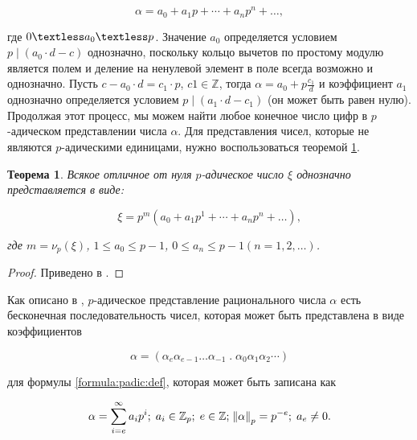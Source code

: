 \documentclass[master, och, diploma, times]{sty/SCWorks}
\theoremstyle{plain}
\newtheorem{thethm}{Теорема}[section]
\theoremstyle{definition}
\numberwithin{equation}{section}
\begin{document}
\begin{equation}\label{formula:padic:def}
\alpha=a_0+a_1p+\cdots+a_np^n+\dots,	
\end{equation}

\noindent где $0 \textless a_0 \textless p$. Значение $a_0$ определяется условием $p \mid (a_0 \cdot d-c)$ однозначно, поскольку кольцо вычетов по простому модулю является полем и деление на ненулевой элемент в поле всегда возможно и однозначно. Пусть $c-a_0 \cdot d=c_1 \cdot p$, $c1 \in \mathbb{Z}$, тогда $\alpha=a_0+p\frac{c_1}{d}$ и коэффициент $a_1$ однозначно определяется условием $p \mid (a_1 \cdot d-c_1)$ (он может быть равен нулю). Продолжая этот процесс, мы можем найти любое конечное число цифр в $p$-адическом представлении числа $\alpha$. Для представления чисел, которые не являются $p$-адическими единицами, нужно воспользоваться теоремой \ref{th:numbers:representation}.

\begin{thethm}\label{th:numbers:representation}
Всякое отличное от нуля $p$-адическое число $\xi$ однозначно представляется в виде:

\begin{equation}
\xi=p^m(a_0+a_1p^1+\cdots+a_np^n+\dots),
\end{equation}

\noindent где $m=\nu_p(\xi)$, $1 \le a_0 \le p-1$, $0 \le a_n \le p-1$$(n=1,2,\dots)$.
\end{thethm}

\begin{proof}
Приведено в \cite{bib:number:borevich}.
\end{proof}


Как описано в \cite{bib:analysis:schikhof}, $p$-адическое представление рационального числа $\alpha$ есть бесконечная последовательность чисел, которая может быть представлена в виде коэффициентов

\begin{equation}\label{formula:numbers:2}
\alpha=(\alpha_{e}\alpha_{e-1}\dots\alpha_{-1} \; . \; \alpha_0\alpha_1\alpha_2\cdots)
\end{equation}

\noindent для формулы \ref{formula:padic:def}, которая может быть записана как

\begin{equation}
\alpha=\sum\limits_{i=e}^{\infty} a_ip^i; \; a_i \in \mathbb{Z}_p; \; e \in \mathbb{Z}; \; \norm{\alpha}_p=p^{-e}; \; a_e \neq 0.
\end{equation}
\end{document}
